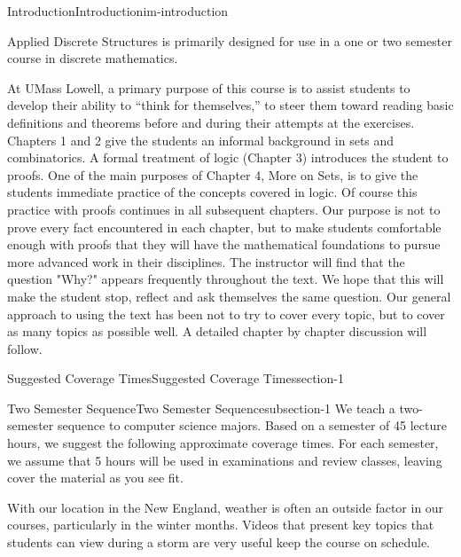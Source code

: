 \documentclass[oneside,10pt,]{book}
\begin{document}
\begin{chapterptx}{Introduction}{}{Introduction}{}{}{im-introduction}
\begin{introduction}{}%
\hypertarget{p-3}{}%
Applied Discrete Structures is primarily designed for use in a one or two semester course in discrete mathematics.%
\par
\hypertarget{p-4}{}%
At UMass Lowell, a primary purpose of this course is to assist students to develop their ability to ``think for themselves,'' to steer them toward reading basic definitions and theorems before and during their attempts at the exercises. Chapters 1 and 2 give the students an informal background in sets and combinatorics. A formal treatment of logic (Chapter 3) introduces the student to proofs. One of the main purposes of Chapter 4, More on Sets, is to give the students immediate practice of the concepts covered in logic. Of course this practice with proofs continues in all subsequent chapters. Our purpose is not to prove every fact encountered in each chapter, but to make students comfortable enough with proofs that they will have the mathematical foundations to pursue more advanced work in their disciplines. The instructor will find that the question "Why?" appears frequently throughout the text. We hope that this will make the student stop, reflect and ask themselves the same question. Our general approach to using the text has been not to try to cover every topic, but to cover as many topics as possible well. A detailed chapter by chapter discussion will follow.%
\end{introduction}%
%
%
\typeout{************************************************}
\typeout{************************************************}
%
\begin{sectionptx}{Suggested Coverage Times}{}{Suggested Coverage Times}{}{}{section-1}
%
%
\typeout{************************************************}
\typeout{************************************************}
%
\begin{subsectionptx}{Two Semester Sequence}{}{Two Semester Sequence}{}{}{subsection-1}
\hypertarget{p-5}{}%
We teach a two-semester sequence to computer science majors. Based on a semester of 45 lecture hours, we suggest the following approximate coverage times. For each semester, we assume that 5 hours will be used in examinations and review classes, leaving cover the material as you see fit.%
\par
\hypertarget{p-6}{}%
With our location in the New England, weather is often an outside factor in our courses, particularly in the winter months.  Videos that present key topics that students can view during a storm are very useful keep the course on schedule.%

\end{subsectionptx}
\end{sectionptx}
\end{chapterptx}
\end{document}
